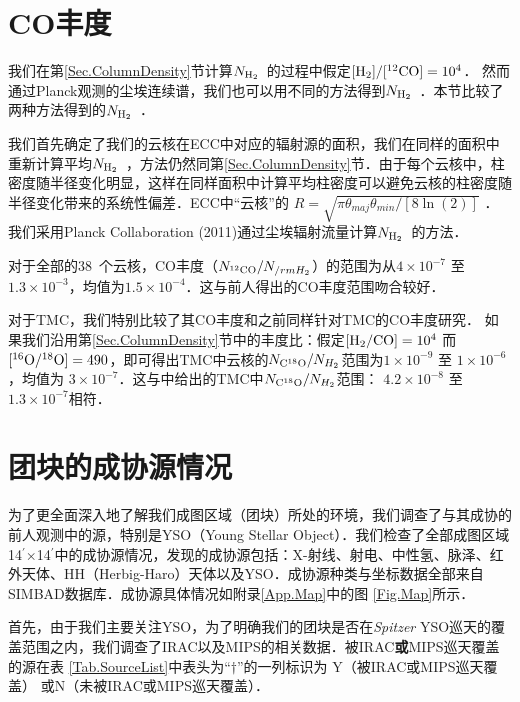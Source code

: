\documentclass[UTF8, nocolorlinks]{pkuthss}
\newcommand{\nhyd}{$N_{\rm H_2}$\ }
\newcommand{\arcmin}{$^{\prime}$}
\newcommand{\numcore}{38\ }
\begin{document}
	\section{CO丰度}

		我们在第\ref{Sec.ColumnDensity}节计算\nhyd 的过程中假定$\rm [H_2]/[ ^{12}CO]=10^4$． 然而通过Planck观测的尘埃连续谱，我们也可以用不同的方法得到\nhyd ．本节比较了两种方法得到的\nhyd ．

		我们首先确定了我们的云核在ECC中对应的辐射源的面积，我们在同样的面积中重新计算平均\nhyd ，方法仍然同第\ref{Sec.ColumnDensity}节．由于每个云核中，柱密度随半径变化明显，这样在同样面积中计算平均柱密度可以避免云核的柱密度随半径变化带来的系统性偏差．ECC中“云核”的 $R=\sqrt{\pi\theta_{maj}\theta_{min}/[8\ln(2)]}$ ．我们采用Planck Collaboration (2011)通过尘埃辐射流量计算\nhyd 的方法\supercite{2011A&A...536A..23P}．

		对于全部的\numcore 个云核，CO丰度（$N_{^{12}\rm CO}/N_{/rmH_2}$）的范围为从$4\times 10^{-7}$ 至$1.3\times 10^{-3 }$，均值为$1.5\times 10^{-4}$．这与前人得出的CO丰度范围吻合较好\supercite{1988ApJ...334..771V}．

		对于TMC，我们特别比较了其CO丰度和之前同样针对TMC的CO丰度研究\supercite{1982ApJ...262..590F}． 如果我们沿用第\ref{Sec.ColumnDensity}节中的丰度比\supercite{1991ApJ...374..540G}：假定$\rm [H_2/CO] = 10^4$ 而 $\rm [^{16}O/^{18}O]=490$，即可得出TMC中云核的$N_{\rm C^{18}O}/N_{H_2}$范围为$1\times 10^{-9}$ 至 $1\times 10^{-6 }$，均值为 $3\times 10^{-7}$．这与\parencite{1982ApJ...262..590F}中给出的TMC中$N_{\rm C^{18}O}/N_{H_2}$范围： $4.2\times 10^{-8}$ 至 $1.3\times 10^{-7}$相符．

	\section{团块的成协源情况}

		为了更全面深入地了解我们成图区域（团块）所处的环境，我们调查了与其成协的前人观测中的源，特别是YSO（Young Stellar Object）．我们检查了全部成图区域14\arcmin$\times$14\arcmin 中的成协源情况，发现的成协源包括：X-射线、射电、中性氢、脉泽、红外天体、HH（Herbig-Haro）天体以及YSO．成协源种类与坐标数据全部来自SIMBAD数据库\supercite{2007ASPC..377..197W}．成协源具体情况如附录\ref{App.Map}中的图 \ref{Fig.Map}所示．

		首先，由于我们主要关注YSO，为了明确我们的团块是否在\emph{Spitzer} YSO巡天的覆盖范围之内，我们调查了IRAC以及MIPS的相关数据\supercite{2010ApJS..186..259R}．被IRAC\textbf{或}MIPS巡天覆盖的源在表 \ref{Tab.SourceList}中表头为“$\dagger$”的一列标识为 Y（被IRAC或MIPS巡天覆盖） 或N（未被IRAC或MIPS巡天覆盖）．
\end{document}
